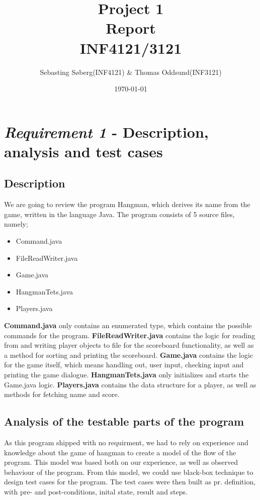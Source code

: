 \documentclass{article}
\title{Project 1 \\ Report \\ INF4121/3121} %
\date{\today} %
\author{Sebasting Søberg(INF4121) \& Thomas Oddsund(INF3121)}
\begin{document}
\maketitle %

\section{\textit{Requirement 1} - Description, analysis and test cases}

	\subsection{Description}
	We are going to review the program Hangman, which derives its name from the game, written in the language Java. The program consists of 5 source files, namely;
	\begin{itemize}
	\item Command.java
	\item FileReadWriter.java
	\item Game.java
	\item HangmanTets.java
	\item Players.java
	\end{itemize}

	\textbf{Command.java} only contains an enumerated type, which contains the possible commands for the program. \textbf{FileReadWriter.java} contains the logic for reading from and writing player objects to file for the scoreboard functionality, as well as a method for sorting and printing the scoreboard. \textbf{Game.java} contains the logic for the game itself, which means handling out, user input, checking input and printing the game dialogue. \textbf{HangmanTets.java} only initializes and starts the Game.java logic. \textbf{Players.java} contains the data structure for a player, as well as methods for fetching name and score.

	\subsection{Analysis of the testable parts of the program\newline}
	As this program shipped with no requirment, we had to rely on experience and knowledge about the game of hangman to create a model of the flow of the program. This model was based both on our experience, as well as observed behaviour of the program. From this model, we could use black-box technique to design test cases for the program. The test cases were then built as pr. definition, with pre- and post-conditions, inital state, result and steps.
	
\end{document}
